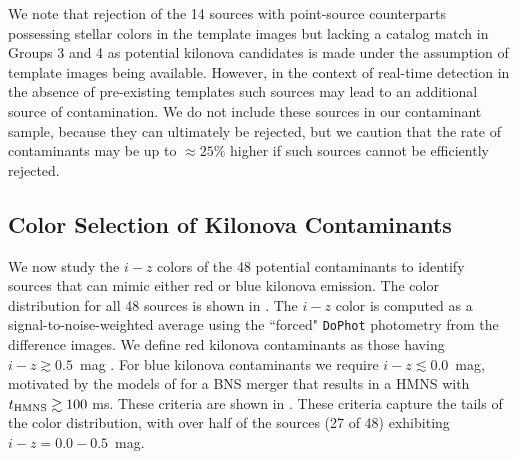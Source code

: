 We note that rejection of the 14 sources with point-source counterparts possessing stellar colors in the template images but lacking a catalog match in Groups 3 and 4 as potential kilonova candidates is made under the assumption of template images being available. However, in the context of real-time detection in the absence of pre-existing templates such sources may lead to an additional source of contamination. We do not include these sources in our contaminant sample, because they can ultimately be rejected, but we caution that the rate of contaminants may be up to $\approx 25\%$ higher if such sources cannot be efficiently rejected.

\clearpage
\subsection{Color Selection of Kilonova Contaminants}
\label{sec:ch3_kn_search}
We now study the $i-z$ colors of the 48 potential contaminants to identify sources that can mimic either red or blue kilonova emission. The color distribution for all 48 sources is shown in . The $i-z$ color is computed as a signal-to-noise-weighted average using the ``forced" {\tt DoPhot} photometry from the difference images. We define red kilonova contaminants as those having $i-z \gtrsim 0.5$~mag \citep{BarnesKasen13,CowpBerger15}. For blue kilonova contaminants we require $i-z \lesssim 0.0$~mag, motivated by the models of \cite{Kasen+15} for a BNS merger that results in a HMNS with $t_{\rm HMNS}\gtrsim 100$ ms. These criteria are shown in . These criteria capture the tails of the color distribution, with over half of the sources (27 of 48) exhibiting $i-z = 0.0-0.5$~mag.

